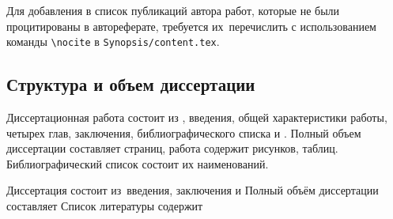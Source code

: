 Для добавления в список публикаций автора работ, которые не были процитированы в
автореферате, требуется их~перечислить с использованием команды \verb!\nocite! в
\verb!Synopsis/content.tex!.

\subsection*{Структура и объем диссертации}


Диссертационная работа состоит из , введения, общей характеристики работы, четырех глав, заключения, библиографического списка и . Полный объем диссертации составляет  страниц, работа содержит  рисунков,  таблиц. Библиографический список состоит их  наименований.


Диссертация состоит из~введения,
заключения и
%
Полный объём диссертации составляет
Список литературы содержит











